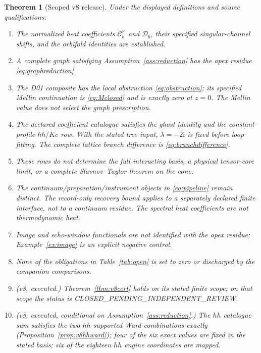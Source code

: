 \documentclass[11pt,a4paper]{article}
\newcommand{\ii}{\mathrm i}
\newcommand{\Fr}{\mathrm F}
\newcommand{\CPIR}{\textsf{CLOSED\_PENDING\_}\allowbreak\textsf{INDEPENDENT\_REVIEW}}
\newcommand{\Ccal}{\mathcal C}
\newcommand{\Dcal}{\mathcal D}
\theoremstyle{plain}
\newtheorem{theorem}{Theorem}[section]
\theoremstyle{definition}
\theoremstyle{remark}
\numberwithin{equation}{section}
\begin{document}
\begin{theorem}[Scoped v8 release]
\label{thm:release}
Under the displayed definitions and source qualifications:
\begin{enumerate}[label=\textup{(\roman*)}]
\item The normalized heat coefficients \(\Ccal_b^\Fr\) and
\(\Dcal_b\), their specified singular-channel shifts, and the
orbifold identities are established.

\item A complete graph satisfying
Assumption~\ref{ass:reduction} has the apex residue
\eqref{eq:graphreduction}.

\item The D01 composite has the local obstruction
\eqref{eq:obstruction}; its specified Mellin continuation is
\eqref{eq:Mclosed} and is exactly zero at \(z=0\).
The Mellin value does not select the graph prescription.

\item The declared coefficient catalogue satisfies the ghost
identity and the constant-profile \(hh/Kc\) row.
With the stated tree input,
\(\lambda=-2\ii\) is fixed before loop fitting.
The complete lattice branch difference is
\eqref{eq:branchdifference}.

\item These rows do not determine the full interacting basis,
a physical tensor-core limit, or a complete Slavnov--Taylor
theorem on the cone.

\item The continuum/preparation/instrument objects in
\eqref{eq:pipeline} remain distinct.
The record-only recovery bound applies to a separately declared
finite interface, not to a continuum residue.
The spectral heat coefficients are not thermodynamic heat.

\item Image and echo-window functionals are not identified with
the apex residue; Example~\ref{ex:image} is an explicit negative
control.

\item None of the obligations in Table~\ref{tab:open} is set to
zero or discharged by the companion comparisons.

\item \emph{(v8, executed.)} Theorem~\ref{thm:v8cert} holds on its
stated finite scope; on that scope the status is \CPIR.

\item \emph{(v8, executed, conditional on
Assumption~\ref{ass:reduction}.)} The \(hh\) catalogue sum satisfies
the two \(hh\)-supported Ward combinations exactly
(Proposition~\ref{prop:v8hhward}); four of the six exact values are
fixed in the stated basis; six of the eighteen \(hh\) engine
coordinates are mapped.


\end{enumerate}
\end{theorem}
\end{document}
